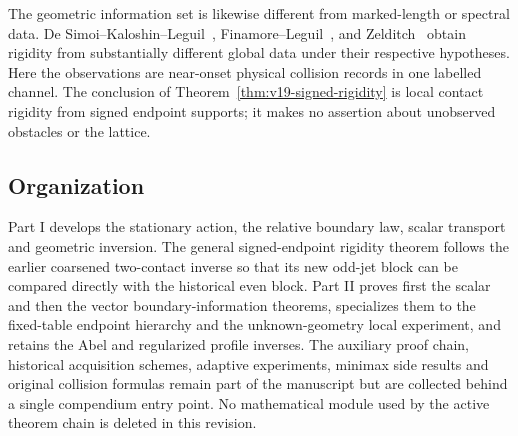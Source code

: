 The geometric information set is likewise different from marked-length or
spectral data.  De Simoi--Kaloshin--Leguil~\cite{DSKL},
Finamore--Leguil~\cite{FinamoreLeguil}, and Zelditch~\cite{Zelditch} obtain
rigidity from substantially different global data under their respective
hypotheses.  Here the observations are near-onset physical collision
records in one labelled channel.  The conclusion of
Theorem~\ref{thm:v19-signed-rigidity} is local contact rigidity from signed
endpoint supports; it makes no assertion about unobserved obstacles or the
lattice.

\subsection{Organization}
Part I develops the stationary action, the relative boundary law, scalar
transport and geometric inversion.  The general signed-endpoint rigidity
theorem follows the earlier coarsened two-contact inverse so that its new
odd-jet block can be compared directly with the historical even block.
Part II proves first the scalar and then the vector boundary-information
theorems, specializes them to the fixed-table endpoint hierarchy and the
unknown-geometry local experiment, and retains the Abel and regularized
profile inverses.  The auxiliary proof chain, historical acquisition
schemes, adaptive experiments, minimax side results and original collision
formulas remain part of the manuscript but are collected behind a single
compendium entry point.  No mathematical module used by the active theorem
chain is deleted in this revision.
